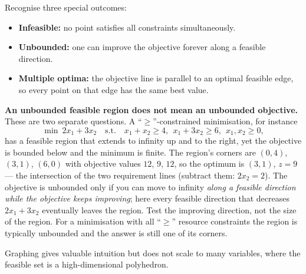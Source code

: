 \documentclass[11pt,a4paper]{article}
\begin{document}
Recognise three special outcomes:
\begin{itemize}
\item \textbf{Infeasible:} no point satisfies all constraints simultaneously.
\item \textbf{Unbounded:} one can improve the objective forever along a feasible direction.
\item \textbf{Multiple optima:} the objective line is parallel to an optimal feasible edge, so every point on that edge has the same best value.
\end{itemize}
\textbf{An unbounded feasible region does not mean an unbounded objective.} These are two separate questions. A ``$\geq$''-constrained minimisation, for instance
\[
 \min\ 2x_1+3x_2\quad\text{s.t.}\quad x_1+x_2\geq4,\ \ x_1+3x_2\geq6,\ \ x_1,x_2\geq0,
\]
has a feasible region that extends to infinity up and to the right, yet the objective is bounded below and the minimum is finite. The region's corners are $(0,4)$, $(3,1)$, $(6,0)$ with objective values $12$, $9$, $12$, so the optimum is $(3,1)$, $z=9$ --- the intersection of the two requirement lines (subtract them: $2x_2=2$). The objective is unbounded only if you can move to infinity \emph{along a feasible direction while the objective keeps improving}; here every feasible direction that decreases $2x_1+3x_2$ eventually leaves the region. Test the improving direction, not the size of the region. For a minimisation with all ``$\geq$'' resource constraints the region is typically unbounded and the answer is still one of its corners.

Graphing gives valuable intuition but does not scale to many variables, where the feasible set is a high-dimensional polyhedron.
\end{document}
